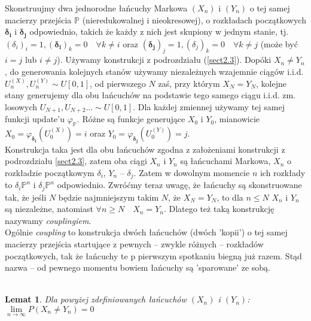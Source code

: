 \documentclass[a4paper]{article}
\theoremstyle{defn}
\theoremstyle{theorem}
\theoremstyle{lemma}
\newtheorem{lemma}[defn]{Lemat}
\theoremstyle{cor}
\theoremstyle{fact}
\begin{document}
Skonstruujmy dwa jednorodne łańcuchy Markowa $(X_n)$ i $(Y_n)$ o tej samej macierzy przejścia $\mathbb{P}$ (nieredukowalnej i nieokresowej), o rozkładach początkowych $\boldsymbol{\delta_i}$ i $\boldsymbol{\delta_j}$ odpowiednio, takich że każdy z nich jest skupiony w jednym stanie, tj. $(\delta_i)_i = 1, (\boldsymbol{\delta_i})_k = 0 \quad \forall k \neq i$ oraz $(\boldsymbol{\delta_j})_j = 1, (\delta_j)_k = 0 \quad \forall k \neq j$ (może być $i=j$ lub $i\neq j$). Używamy konstrukcji z podrozdziału (\ref{sect2.3}). Dopóki $X_n \neq Y_n$, do generowania kolejnych stanów używamy niezależnych wzajemnie ciągów i.i.d. $U_n^{(X)}, U_n^{(Y)} \sim U[0,1]$, od pierwszego $N$ zaś, przy którym $X_N = Y_N$, kolejne stany generujemy dla obu łańcuchów na podstawie tego samego ciągu i.i.d. zm. losowych $U_{N+1}, U_{N+2} ... \sim U[0,1]$. Dla każdej zmiennej używamy tej samej funkcji update'u $\varphi_{\mathbb{P}}$. Różne są funkcje generujące $X_0$ i $Y_0$, mianowicie $X_0 = \varphi_{\boldsymbol{\delta_i}}(U_0^{(X)}) = i$ oraz $Y_0 = \varphi_{\boldsymbol{\delta_j}}(U_0^{(Y)}) = j$.\\
Konstrukcja taka jest dla obu łańcuchów zgodna z założeniami konstrukcji z podrozdziału \ref{sect2.3}, zatem oba ciągi $X_n$ i $Y_n$ są łańcuchami Markowa, $X_n$ o rozkładzie początkowym $\delta_i$, $Y_n$ – $\delta_j$. Zatem w dowolnym momencie $n$ ich rozkłady to $\delta_i\mathbb{P}^n$ i $\delta_j\mathbb{P}^n$ odpowiednio. Zwróćmy teraz uwagę, że łańcuchy są skonstruowane tak, że jeśli $N$ będzie najmniejszym takim $N$, że $X_N = Y_N$, to dla $n \leq N$ $X_n$ i $Y_n$ są niezależne, natomiast $\forall n \geq N \quad X_n = Y_n$. Dlatego też taką konstrukcję nazywamy \textit{couplingiem}.\\
Ogólnie \textit{coupling} to konstrukcja dwóch łańcuchów (dwóch 'kopii') o tej samej macierzy przejścia startujące z pewnych – zwykle różnych – rozkładów początkowych, tak że łańcuchy te p pierwszym spotkaniu biegną już razem. Stąd nazwa – od pewnego momentu bowiem łańcuchy są 'sparowane' ze sobą.
\\
\\
\begin{lemma}\label{lemma2.4.5}
Dla powyżej zdefiniowanych łańcuchów $(X_n)$ i $(Y_n)$: $\lim\limits_{n \to \infty} P(X_n \neq Y_n) = 0$
\end{lemma}
\end{document}
